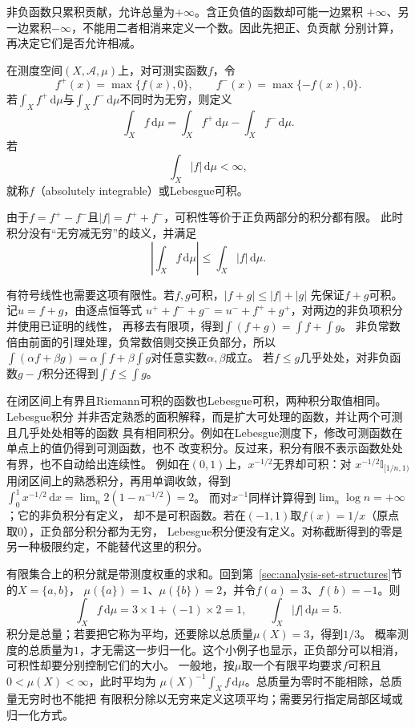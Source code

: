非负函数只累积贡献，允许总量为$+\infty$。含正负值的函数却可能一边累积
$+\infty$、另一边累积$-\infty$，不能用二者相消来定义一个数。因此先把正、负贡献
分别计算，再决定它们是否允许相减。
\begin{definition}[有符号积分与可积性]
\label{def:analysis-integrable-function}
在测度空间$(X,\mathcal{A},\mu)$上，对可测实函数$f$，令
\[   f^+(x)=\max\{f(x),0\},\qquad   f^-(x)=\max\{-f(x),0\}. \]
若$\int_X f^+\,\mathrm{d}\mu$与$\int_X f^-\,\mathrm{d}\mu$不同时为无穷，则定义
\[
  \int_X f\,\mathrm{d}\mu
  =\int_X f^+\,\mathrm{d}\mu-\int_X f^-\,\mathrm{d}\mu.
\]
若
\begin{equation}
  \int_X|f|\,\mathrm{d}\mu<\infty,
\label{eq:analysis-absolute-integrability}
\end{equation}
就称$f$（absolutely integrable）或Lebesgue可积。
\end{definition}
由于$f=f^+-f^-$且$|f|=f^++f^-$，可积性等价于正负两部分的积分都有限。
此时积分没有“无穷减无穷”的歧义，并满足
\[   \left|\int_X f\,\mathrm{d}\mu\right|   \leq   \int_X|f|\,\mathrm{d}\mu. \]

有符号线性也需要这项有限性。若$f,g$可积，$|f+g|\leq|f|+|g|$
先保证$f+g$可积。记$u=f+g$，由逐点恒等式
$u^++f^-+g^-=u^-+f^++g^+$，对两边的非负项积分并使用已证明的线性，
再移去有限项，得到$\int(f+g)=\int f+\int g$。
非负常数倍由前面的引理处理，负常数倍则交换正负部分，所以
$\int(\alpha f+\beta g)=\alpha\int f+\beta\int g$对任意实数$\alpha,\beta$成立。
若$f\leq g$几乎处处，对非负函数$g-f$积分还得到$\int f\leq\int g$。

在闭区间上有界且Riemann可积的函数也Lebesgue可积，两种积分取值相同。Lebesgue积分
并非否定熟悉的面积解释，而是扩大可处理的函数，并让两个可测且几乎处处相等的函数
具有相同积分。例如在Lebesgue测度下，修改可测函数在单点上的值仍得到可测函数，也不
改变积分。反过来，积分有限不表示函数处处有界，也不自动给出连续性。
例如在$(0,1)$上，$x^{-1/2}$无界却可积：对
$x^{-1/2}\mathbb I_{[1/n,1)}$用闭区间上的熟悉积分，再用单调收敛，得到
$\int_0^1x^{-1/2}\,\mathrm dx=\lim_n2(1-n^{-1/2})=2$。
而对$x^{-1}$同样计算得到$\lim_n\log n=+\infty$；它的非负积分有定义，
却不是可积函数。若在$(-1,1)$取$f(x)=1/x$（原点取$0$），正负部分积分都为无穷，
Lebesgue积分便没有定义。对称截断得到的零是另一种极限约定，不能替代这里的积分。

有限集合上的积分就是带测度权重的求和。回到第~\ref{sec:analysis-set-structures}节的$X=\{a,b\}$，
$\mu(\{a\})=1$、$\mu(\{b\})=2$，并令$f(a)=3$、$f(b)=-1$。则
\[
 \int_Xf\,\mathrm d\mu=3\times1+(-1)\times2=1,
 \qquad \int_X|f|\,\mathrm d\mu=5.
\]
积分是总量；若要把它称为平均，还要除以总质量$\mu(X)=3$，得到$1/3$。
概率测度的总质量为$1$，才无需这一步归一化。这个小例子也显示，正负部分可以相消，
可积性却要分别控制它们的大小。
一般地，按$\mu$取一个有限平均要求$f$可积且$0<\mu(X)<\infty$，此时平均为
$\mu(X)^{-1}\int_X f\,\mathrm d\mu$。总质量为零时不能相除，总质量无穷时也不能把
有限积分除以无穷来定义这项平均；需要另行指定局部区域或归一化方式。

